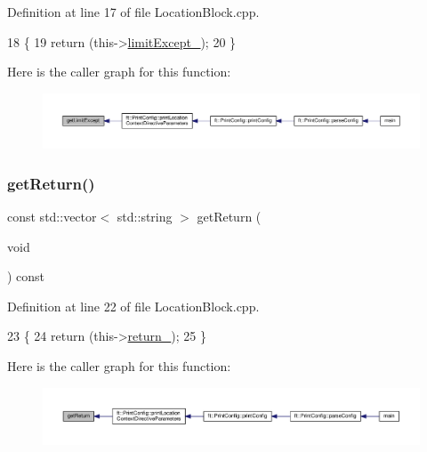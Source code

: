 Definition at line 17 of file Location\+Block.\+cpp.


\begin{DoxyCode}
18     \{
19         \textcolor{keywordflow}{return} (this->\hyperlink{classft_1_1_location_block_a8fec53119566b5654a7b902a1c53c6d9}{limitExcept\_});
20     \}
\end{DoxyCode}
Here is the caller graph for this function\+:
\nopagebreak
\begin{figure}[H]
\begin{center}
\leavevmode
\includegraphics[width=350pt]{classft_1_1_location_block_ad2dc75d3f9c9f06f31e3948823557d52_icgraph}
\end{center}
\end{figure}
\mbox{\label{classft_1_1_location_block_aeef5e4710c02406c46e54d4aa0c8f57c}} 
\subsubsection{\texorpdfstring{get\+Return()}{getReturn()}}
{\footnotesize\ttfamily const std\+::vector$<$ std\+::string $>$ get\+Return (\begin{DoxyParamCaption}\item[{void}]{ }\end{DoxyParamCaption}) const}



Definition at line 22 of file Location\+Block.\+cpp.


\begin{DoxyCode}
23     \{
24         \textcolor{keywordflow}{return} (this->\hyperlink{classft_1_1_location_block_abab721f365aff66f8a1289de21c8f01f}{return\_});
25     \}
\end{DoxyCode}
Here is the caller graph for this function\+:
\nopagebreak
\begin{figure}[H]
\begin{center}
\leavevmode
\includegraphics[width=350pt]{classft_1_1_location_block_aeef5e4710c02406c46e54d4aa0c8f57c_icgraph}
\end{center}
\end{figure}
\mbox{\label{classft_1_1_base_directives_aa5dbcb08bda0a0e7e502d2df7cf64287}} 
